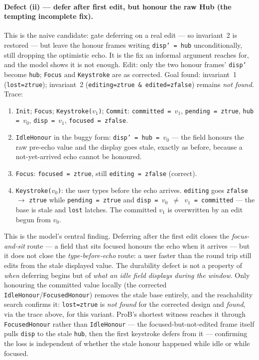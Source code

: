 \documentclass[a4paper,10pt,fleqn]{article}
\begin{document}
\paragraph{Defect (ii) --- defer after first edit, but honour the raw Hub (the
tempting incomplete fix).}
This is the naive candidate: gate deferring on a real edit --- so invariant~2 is
restored --- but leave the honour frames writing \texttt{disp' = hub}
unconditionally, still dropping the optimistic echo.  It is the fix an informal
argument reaches for, and the model shows it is not enough.  Edit: only the two
honour frames' \texttt{disp'} become \texttt{hub}; \texttt{Focus} and
\texttt{Keystroke} are as corrected.  Goal found: invariant~1
(\texttt{lost=ztrue}); invariant~2 (\texttt{editing=ztrue \& edited=zfalse})
remains \emph{not found}.  Trace:
\begin{enumerate}
  \item \texttt{Init}; \texttt{Focus}; \texttt{Keystroke($v_1$)};
    \texttt{Commit}: \texttt{committed = $v_1$}, \texttt{pending = ztrue},
    \texttt{hub = $v_0$}, \texttt{disp = $v_1$}, \texttt{focused = zfalse}.
  \item \texttt{IdleHonour} in the buggy form: \texttt{disp' = hub = $v_0$} ---
    the field honours the raw pre-echo value and the display goes stale, exactly
    as before, because a not-yet-arrived echo cannot be honoured.
  \item \texttt{Focus}: \texttt{focused = ztrue}, still \texttt{editing =
    zfalse} (correct).
  \item \texttt{Keystroke($v_0$)}: the user types before the echo arrives.
    \texttt{editing} goes \texttt{zfalse} $\to$ \texttt{ztrue} while
    \texttt{pending = ztrue} and \texttt{disp = $v_0$ $\neq$ $v_1$ = committed}
    --- the base is stale and \texttt{lost} latches.  The committed $v_1$ is
    overwritten by an edit begun from $v_0$.
\end{enumerate}
This is the model's central finding.  Deferring after the first edit closes the
\emph{focus-and-sit} route --- a field that sits focused honours the echo when it
arrives --- but it does not close the \emph{type-before-echo} route: a user
faster than the round trip still edits from the stale displayed value.  The
durability defect is not a property of \emph{when} deferring begins but of
\emph{what an idle field displays during the window}.  Only honouring the
committed value locally (the corrected \texttt{IdleHonour}/\texttt{FocusedHonour})
removes the stale base entirely, and the reachability search confirms it:
\texttt{lost=ztrue} is \emph{not found} for the corrected design and
\emph{found}, via the trace above, for this variant.  ProB's shortest witness
reaches it through \texttt{FocusedHonour} rather than \texttt{IdleHonour} --- the
focused-but-not-edited frame itself pulls \texttt{disp} to the stale
\texttt{hub}, then the first keystroke defers from it --- confirming the loss is
independent of whether the stale honour happened while idle or while focused.
\end{document}
